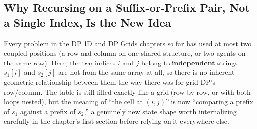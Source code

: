 \subsection*{Why Recursing on a Suffix-or-Prefix Pair, Not a Single Index, Is the New Idea}

Every problem in the DP 1D and DP Grids chapters so far has used at most
two coupled positions (a row and column on one shared structure, or two
agents on the same row). Here, the two indices $i$ and $j$ belong to
\textbf{independent} strings -- $s_1[i]$ and $s_2[j]$ are not from the
same array at all, so there is no inherent geometric relationship between
them the way there was for grid DP's row/column. The table is still
filled exactly like a grid (row by row, or with both loops nested), but
the meaning of ``the cell at $(i,j)$'' is now ``comparing a prefix of
$s_1$ against a prefix of $s_2$,'' a genuinely new state shape worth
internalizing carefully in the chapter's first section before relying on
it everywhere else.

\newpage











